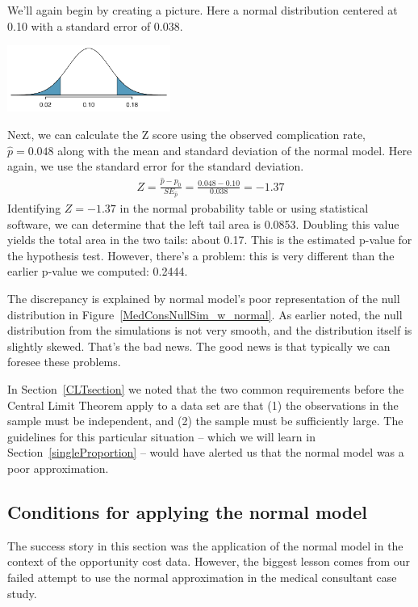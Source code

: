We'll again begin by creating a picture. Here a normal distribution centered at 0.10 with a standard error of 0.038.
\begin{center}
\includegraphics[width=0.4\textwidth]{02/figures/MedicalConsultant/MedConsNullSim_normal_only}
\end{center}
Next, we can calculate the Z score using the observed complication rate, $\hat{p} = 0.048$ along with the mean and standard deviation of the normal model. Here again, we use the standard error for the standard deviation.
\begin{align*}
Z = \frac{\hat{p} - p_0}{SE_{\hat{p}}} = \frac{0.048 - 0.10}{0.038} = -1.37
\end{align*}
Identifying $Z = -1.37$ in the normal probability table or using statistical software, we can determine that the left tail area is 0.0853. Doubling this value yields the total area in the two tails: about 0.17. This is the estimated p-value for the hypothesis test. However, there's a problem: this is very different than the earlier p-value we computed: 0.2444.

The discrepancy is explained by normal model's poor representation of the null distribution in Figure~\ref{MedConsNullSim_w_normal}. As earlier noted, the null distribution from the simulations is not very smooth, and the distribution itself is slightly skewed. That's the bad news. The good news is that typically we can foresee these problems.

In Section~\ref{CLTsection} we noted that the two common requirements before the Central Limit Theorem apply to a data set are that (1) the observations in the sample must be independent, and (2) the sample must be sufficiently large. The guidelines for this particular situation -- which we will learn in Section~\ref{singleProportion} -- would have alerted us that the normal model was a poor approximation.


\subsection{Conditions for applying the normal model}

The success story in this section was the application of the normal model in the context of the opportunity cost data. However, the biggest lesson comes from our failed attempt to use the normal approximation in the medical consultant case study.

